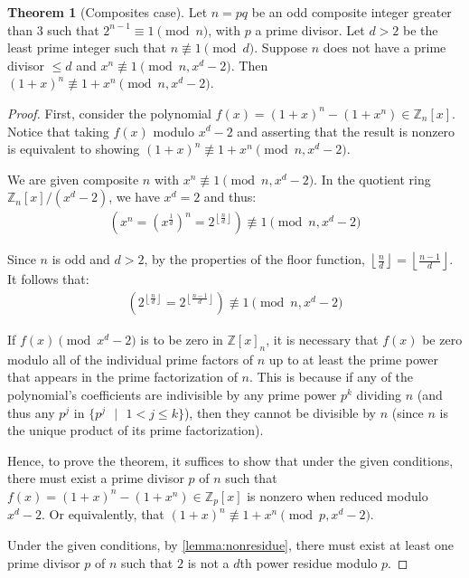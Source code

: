 \documentclass{article}
\theoremstyle{plain}
\theoremstyle{definition}
\newtheorem{theorem}{Theorem}
\newcommand{\floor}[1]{\left\lfloor #1 \right\rfloor}
\begin{document}
\begin{theorem}[Composites case] \label{theorem:composites}
Let $n = pq$ be an odd composite integer greater than $3$ such that $2^{n-1} \equiv 1 \pmod{n}$, with $p$ a prime divisor. Let $d > 2$ be the least prime integer such that $n \not\equiv 1 \pmod{d}$. Suppose $n$ does not have a prime divisor $\leq d$ and $x^n \not\equiv 1 \pmod{n, x^d-2}$. Then $(1 + x)^n \not\equiv 1 + x^n \pmod{n, x^d-2}$.
\end{theorem}
\begin{proof}
First, consider the polynomial $f(x) = (1 + x)^n - (1 + x^n) \in \mathbb{Z}_n[x]$. Notice that taking $f(x)$ modulo $x^d - 2$ and asserting that the result is nonzero is equivalent to showing $(1 + x)^n \not\equiv 1 + x^n \pmod{n, x^d-2}$.

We are given composite $n$ with $x^n \not\equiv 1 \pmod{n, x^d-2}$. In the quotient ring $\mathbb{Z}_n[x]/(x^d-2)$, we have $x^d = 2$ and thus:
\begin{align}
    \left(x^n = (x^{\frac{1}{d}})^n = 2^{\floor{\frac{n}{d}}}\right) \not\equiv 1 \pmod{n,x^d-2}
\end{align}

Since $n$ is odd and $d > 2$, by the properties of the floor function, $\left\lfloor\frac{n}{d}\right\rfloor = \left\lfloor\frac{n-1}{d}\right\rfloor$. It follows that:
\begin{align}
    \left(2^{\left\lfloor\frac{n}{d}\right\rfloor} = 2^{\left\lfloor\frac{n-1}{d}\right\rfloor}\right) \not\equiv 1 \pmod{n,x^d-2}
\end{align}

If $f(x) \pmod{x^d-2}$ is to be zero in $\mathbb{Z}[x]_n$, it is necessary that $f(x)$ be zero modulo all of the individual prime factors of $n$ up to at least the prime power that appears in the prime factorization of $n$. This is because if any of the polynomial's coefficients are indivisible by any prime power $p^k$ dividing $n$ (and thus any $p^j$ in $\{ p^j \text{ } | \text{ } 1 < j \leq k \}$), then they cannot be divisible by $n$ (since $n$ is the unique product of its prime factorization).

Hence, to prove the theorem, it suffices to show that under the given conditions, there must exist a prime divisor $p$ of $n$ such that $f(x) = (1 + x)^n - (1 + x^n) \in \mathbb{Z}_p[x]$ is nonzero when reduced modulo $x^d - 2$. Or equivalently, that $(1 + x)^n \not\equiv 1 + x^n \pmod{p, x^d-2}$.

Under the given conditions, by \cref{lemma:nonresidue}, there must exist at least one prime divisor $p$ of $n$ such that $2$ is not a $d$th power residue modulo $p$.


\end{proof}
\end{document}
